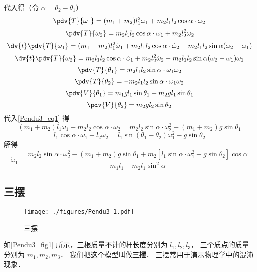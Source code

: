 代入得（令 $\alpha = \theta_2-\theta_1$）
\begin{equation}
\pdv{T}{\omega_1} = (m_1 + m_2)l_1^2\omega_1 + m_2l_1l_2\cos\alpha\cdot\omega_2
\end{equation}
\begin{equation}
\pdv{T}{\omega_2} = m_2l_1l_2\cos\alpha\cdot\omega_1 + m_2l_2^2\omega_2
\end{equation}
\begin{equation}
\dv{t}\pdv{T}{\omega_1} = (m_1 + m_2)l_1^2\dot\omega_1 + m_2l_1l_2\cos\alpha\cdot\dot\omega_2 - m_2l_1l_2\sin\alpha(\omega_2-\omega_1)
\end{equation}
\begin{equation}
\dv{t}\pdv{T}{\omega_2} = m_2l_1l_2\cos\alpha\cdot\dot\omega_1 + m_2l_2^2\dot\omega_2 -m_2l_1l_2\sin\alpha(\omega_2-\omega_1)\omega_1
\end{equation}
\begin{equation}
\pdv{T}{\theta_1} = m_2l_1l_2\sin\alpha\cdot \omega_1\omega_2
\end{equation}
\begin{equation}
\pdv{T}{\theta_2} = -m_2l_1l_2\sin\alpha\cdot \omega_1\omega_2
\end{equation}
\begin{equation}
\pdv{V}{\theta_1} = m_1gl_1\sin\theta_1 + m_2gl_1\sin\theta_1
\end{equation}
\begin{equation}
\pdv{V}{\theta_2} = m_2gl_2\sin\theta_2
\end{equation}
代入\autoref{Pendu3_eq1} 得
\begin{equation}
(m_1+m_2)l_1\dot\omega_1 + m_2l_2\cos\alpha\cdot\dot\omega_2 = m_2l_2\sin\alpha\cdot\omega_2^2 - (m_1+m_2)g\sin\theta_1
\end{equation}
\begin{equation}
l_1\cos\alpha\cdot\dot\omega_1 + l_2\dot\omega_2 = l_1\sin(\theta_1-\theta_2)\omega_1^2 - g\sin\theta_2
\end{equation}
解得
\begin{equation}
\dot\omega_1 = \frac{m_2l_2\sin\alpha\cdot\omega_2^2 - (m_1+m_2)g\sin\theta_1 + m_2[l_1\sin\alpha\cdot\omega_1^2 + g\sin\theta_2] \cos\alpha}{m_1l_1 + m_2l_1\sin^2\alpha}
\end{equation}


\subsection{三摆}
\begin{figure}[ht]
\centering
\texttt{[image: ./figures/Pendu3\_1.pdf]}
\caption{三摆} \label{Pendu3_fig1}
\end{figure}
如\autoref{Pendu3_fig1} 所示，三根质量不计的杆长度分别为 $l_1, l_2, l_3$， 三个质点的质量分别为 $m_1, m_2, m_3$． 我们把这个模型叫做\textbf{三摆}． 三摆常用于演示物理学中的混沌现象．

